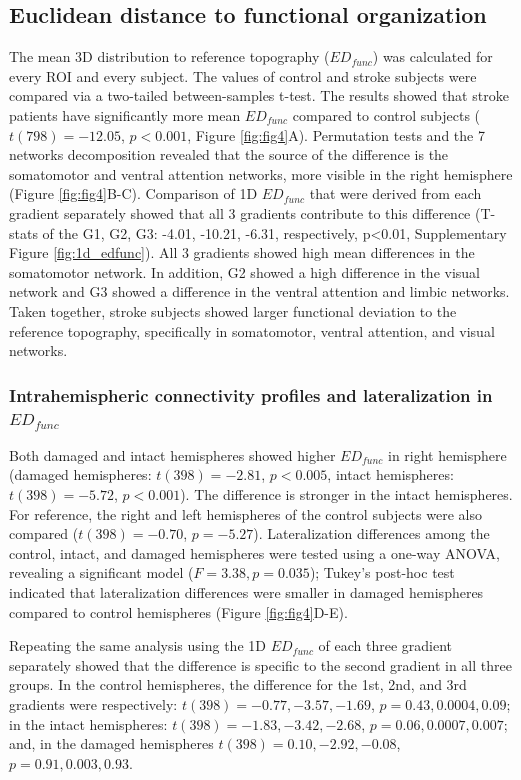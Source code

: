 \documentclass[fleqn,10pt]{wlscirep}
\begin{document}
\subsection*{Euclidean distance to functional organization}
The mean 3D distribution to reference topography ($\textit{ED}_{func}$) was calculated for every ROI and every subject. The values of control and stroke subjects were compared via a two-tailed between-samples t-test. The results showed that stroke patients have significantly more mean $\textit{ED}_{{func}}$ compared to control subjects ($t(798) =  -12.05$, $p < 0.001$, Figure  \ref{fig:fig4}A). Permutation tests and the 7 networks decomposition revealed that the source of the difference is the somatomotor and ventral attention networks, more visible in the right hemisphere (Figure  \ref{fig:fig4}B-C). Comparison of 1D $\textit{ED}_{{func}}$ that were derived from each gradient separately showed that all 3 gradients contribute to this difference (T-stats of the G1, G2, G3:  -4.01, -10.21, -6.31, respectively, p<0.01, Supplementary Figure \ref{fig:1d_edfunc}). All 3 gradients showed high mean differences in the somatomotor network. In addition, G2 showed a high difference in the visual network and G3 showed a difference in the ventral attention and limbic networks. Taken together, stroke subjects showed larger functional deviation to the reference topography, specifically in somatomotor, ventral attention, and visual networks. 

\subsubsection*{Intrahemispheric connectivity profiles and lateralization in $\textit{ED}_{{func}}$}

Both damaged and intact hemispheres showed higher $\textit{ED}_{{func}}$ in right hemisphere (damaged hemispheres: $t(398) = -2.81$, $p<0.005$, intact hemispheres: $t(398) = -5.72$, $p<0.001$). The difference is stronger in the intact hemispheres. For reference, the right and left hemispheres of the control subjects were also compared ($t(398) = -0.70$, $p = -5.27$). Lateralization differences among the control, intact, and damaged hemispheres were tested using a one-way ANOVA, revealing a significant model ($F = 3.38, p = 0.035$); Tukey's post-hoc test indicated that lateralization differences were smaller in damaged hemispheres compared to control hemispheres (Figure \ref{fig:fig4}D-E).


Repeating the same analysis using the 1D $\textit{ED}_{{func}}$ of each three gradient separately showed that the difference is specific to the second gradient in all three groups. In the control hemispheres, the difference for the 1st, 2nd, and 3rd gradients were respectively: $t(398) = -0.77, -3.57, -1.69$, $p = 0.43, 0.0004, 0.09$; in the intact hemispheres: $t(398) = -1.83, -3.42, -2.68$, $p = 0.06, 0.0007, 0.007$; and, in the damaged hemispheres  $t(398) = 0.10, -2.92, -0.08$, $p = 0.91, 0.003, 0.93$.  
\end{document}
